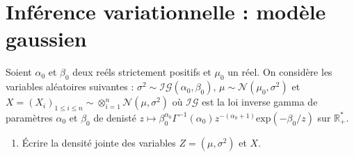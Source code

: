 \documentclass[a4paper,10pt,fleqn]{article}
\newcommand{\1}{\ensuremath{\mathbbm{1}}}
\begin{document}
\section{Inf\'erence variationnelle : mod\`ele gaussien}
Soient $\alpha_0$ et $\beta_0$ deux re\'els strictement positifs et $\mu_0$ un r\'eel. On consid\`ere les variables al\'eatoires suivantes : $\sigma^2 \sim\mathcal{IG}(\alpha_0,\beta_0)$, $\mu\sim\mathcal{N}(\mu_0,\sigma^2)$ et $X = (X_i)_{1\leq i\leq n}\sim\otimes_{i=1}^n\mathcal{N}(\mu,\sigma^2)$ o\`u $\mathcal{IG}$ est la loi inverse gamma de param\`etres $\alpha_0$ et $\beta_0$ de denist\'e $z\mapsto \beta_0^{\alpha_0}\Gamma^{-1}(\alpha_0)z^{-(\alpha_0+1)}\mathrm{exp}(-\beta_0/z)$ sur $\mathbb{R}_+^*$.
\begin{enumerate}
\item \'Ecrire la densit\'e jointe des variables $Z=(\mu,\sigma^2)$ et $X$.
%
%


\end{enumerate}
\end{document}
